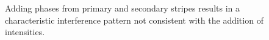 \begin{figure}
  \centering
  \caption{Adding phases from primary and secondary stripes results in a
    characteristic interference pattern not consistent with the addition of
    intensities.}
  \label{fig:sumsq}
\end{figure}

